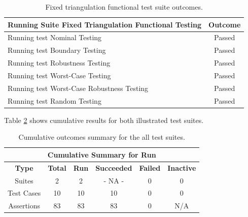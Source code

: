 \begin{table}[tp]
\centering
\begin{tabular}{l|c}
\hline
\textbf{Running Suite Fixed Triangulation Functional Testing} & \textbf{Outcome} \\ \hline
Running test Nominal Testing                                  & Passed           \\
Running test Boundary Testing                                 & Passed           \\
Running test Robustness Testing                               & Passed           \\
Running test Worst-Case Testing                               & Passed           \\
Running test Worst-Case Robustness Testing                    & Passed           \\
Running test Random Testing                                   & Passed          
\end{tabular}
\caption{Fixed triangulation functional test suite outcomes.}
\label{tab:functional2}
\end{table}

Table \ref{tab:cumulative} shows cumulative results for both illustrated test suites.

\begin{table}[tp]
\centering
\begin{tabular}{cccccc}
\multicolumn{6}{c}{\textbf{Cumulative Summary for Run}}                                                                                                                                                          \\ \hline
\multicolumn{1}{c|}{\textbf{Type}} & \multicolumn{1}{c|}{\textbf{Total}} & \multicolumn{1}{c|}{\textbf{Run}} & \multicolumn{1}{c|}{\textbf{Succeeded}} & \multicolumn{1}{c|}{\textbf{Failed}} & \textbf{Inactive} \\ \hline
\multicolumn{1}{c|}{Suites}        & \multicolumn{1}{c|}{2}              & \multicolumn{1}{c|}{2}            & \multicolumn{1}{c|}{- NA -}            & \multicolumn{1}{c|}{0}               & 0                 \\
\multicolumn{1}{c|}{Test Cases}    & \multicolumn{1}{c|}{10}             & \multicolumn{1}{c|}{10}           & \multicolumn{1}{c|}{10}                & \multicolumn{1}{c|}{0}               & 0                 \\
\multicolumn{1}{c|}{Assertions}    & \multicolumn{1}{c|}{83}             & \multicolumn{1}{c|}{83}           & \multicolumn{1}{c|}{83}                & \multicolumn{1}{c|}{0}               & N/A              
\end{tabular}
\caption{Cumulative outcomes summary for the all test suites.}
\label{tab:cumulative}
\end{table}

